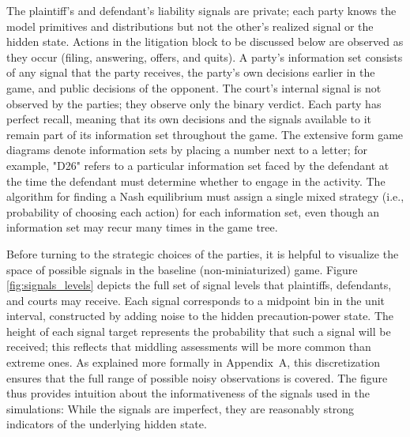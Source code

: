 \documentclass{article}
\begin{document}
The plaintiff’s and defendant’s liability signals are private; each party knows the model primitives and distributions but not the other’s realized signal or the hidden state. Actions in the litigation block to be discussed below are observed as they occur (filing, answering, offers, and quits). A party's information set consists of any signal that the party receives, the party's own decisions earlier in the game, and public decisions of the opponent. The court’s internal signal is not observed by the parties; they observe only the binary verdict. Each party has perfect recall, meaning that its own decisions and the signals available to it remain part of its information set throughout the game. The extensive form game diagrams denote information sets by placing a number next to a letter; for example, "D26" refers to a particular information set faced by the defendant at the time the defendant must determine whether to engage in the activity. The algorithm for finding a Nash equilibrium must assign a single mixed strategy (i.e., probability of choosing each action) for each information set, even though an information set may recur many times in the game tree.

Before turning to the strategic choices of the parties, it is helpful to visualize the space of possible signals in the baseline (non-miniaturized) game. Figure \ref{fig:signals_levels} depicts the full set of signal levels that plaintiffs, defendants, and courts may receive. Each signal corresponds to a midpoint bin in the unit interval, constructed by adding noise to the hidden precaution-power state. The height of each signal target represents the probability that such a signal will be received; this reflects that middling assessments will be more common than extreme ones. As explained more formally in Appendix~A, this discretization ensures that the full range of possible noisy observations is covered. The figure thus provides intuition about the informativeness of the signals used in the simulations: While the signals are imperfect, they are reasonably strong indicators of the underlying hidden state. 
\end{document}
